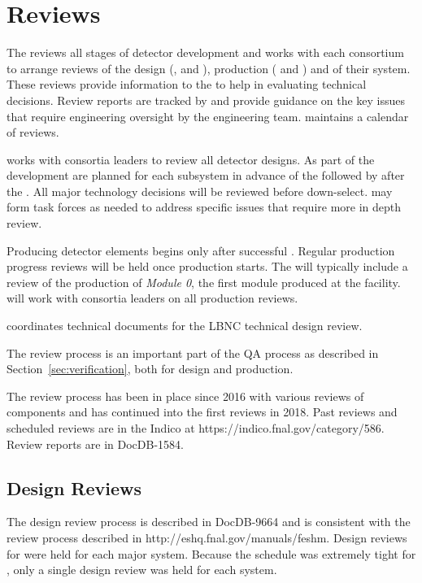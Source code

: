 \chapter{Reviews}
\label{vl:tc-review}

The  reviews all stages of detector development and works
with each consortium to arrange reviews of the design (,
 and ), production ( and
) and  of their system.  These reviews provide
information to the  to help in evaluating technical
decisions.  Review reports are tracked by  and provide
guidance on the key issues that require engineering oversight by the
 engineering team.  maintains a calendar of
 reviews.

 works with consortia leaders to review all detector
designs.  As part of the  development  are
planned for each subsystem in advance of the  followed by
 after the .  All major technology decisions
will be reviewed before down-select.   may form task forces
as needed to address specific issues that require more in depth
review.


Producing detector elements begins only after
successful . Regular production progress
reviews will be held once production starts. The 
will typically include a review of the production of \textit{Module 0}, the
first module produced at the facility.  will work with
consortia leaders on all production reviews.

 coordinates technical documents for the LBNC
technical design review.

The review process is an important part of the  QA process
as described in Section~\ref{sec:verification}, both for
design and production.

The review process has been in place since 2016 with various reviews
of  components and has continued into the first 
reviews in 2018. Past reviews and scheduled reviews are in the
 Indico at https://indico.fnal.gov/category/586.
Review reports are in DocDB-1584\cite{bib:docdb1584}.

\section{Design Reviews}

The  design review process is described in DocDB-9664\cite{bib:docdb9664}
and is consistent with the \fnal review process described in
http://eshq.fnal.gov/manuals/feshm. Design reviews for  were held for each
major system. Because the schedule was extremely tight for , only a single design review
was held for each system.

